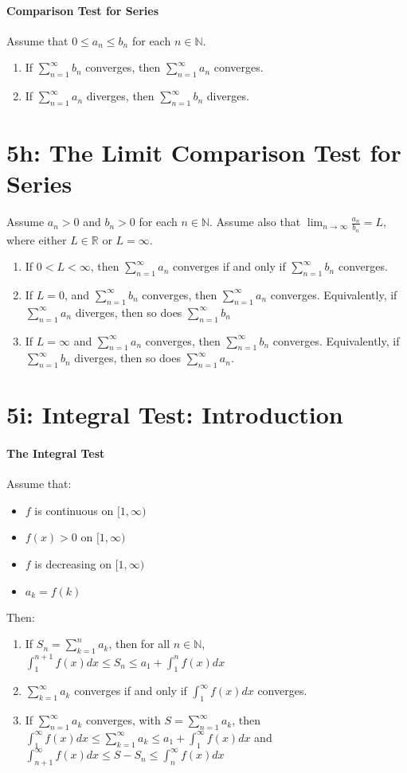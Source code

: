 \documentclass[10pt,letter]{article}
\begin{document}
\paragraph{Comparison Test for Series}
Assume that $0\leq a_n\leq b_n$ for each $n\in\mathbb{N}$. 
\begin{enumerate}
    \item If $\sum_{n=1}^\infty b_n$ converges, then $\sum_{n=1}^\infty a_n$ converges.
    \item If $\sum_{n=1}^\infty a_n$ diverges, then $\sum_{n=1}^\infty b_n$ diverges. 
\end{enumerate}


\section*{5h: The Limit Comparison Test for Series}
Assume $a_n>0$ and $b_n>0$ for each $n\in\mathbb{N}$. Assume also that $\lim_{n\rightarrow\infty}\frac{a_n}{b_n}=L$, where either $L\in\mathbb{R}$ or $L=\infty$. 
\begin{enumerate}
    \item If $0<L<\infty$, then $\sum_{n=1}^\infty a_n$ converges if and only if $\sum_{n=1}^\infty b_n$ converges. 
    \item If $L=0$, and $\sum_{n=1}^\infty b_n$ converges, then $\sum_{n=1}^\infty a_n$ converges. Equivalently, if $\sum_{n=1}^\infty a_n$ diverges, then so does $\sum_{n=1}^\infty b_n$ 
    \item If $L=\infty$ and $\sum_{n=1}^\infty a_n$ converges, then $\sum_{n=1}^\infty b_n$ converges. Equivalently, if $\sum_{n=1}^\infty b_n$ diverges, then so does $\sum_{n=1}^\infty a_n$. 
\end{enumerate}


\section*{5i: Integral Test: Introduction}
\paragraph{The Integral Test}
Assume that: \begin{itemize}
    \item $f$ is continuous on $[1,\infty)$ 
    \item $f(x)>0$ on $[1,\infty)$ 
    \item $f$ is decreasing on $[1,\infty)$ 
    \item $a_k=f(k)$ 
\end{itemize}
Then: 
\begin{enumerate}
    \item If $S_n=\sum_{k=1}^n a_k$, then for all $n\in\mathbb{N}$, $\int_1^{n+1}f(x)dx\leq S_n\leq a_1+\int_1^nf(x)dx$ 
    \item $\sum_{k=1}^\infty a_k$ converges if and only if $\int_1^\infty f(x)dx$ converges. 
    \item If $\sum_{n=1}^\infty a_k$ converges, with $S=\sum_{n=1}^\infty a_k$, then $\int_1^\infty f(x)dx\leq \sum_{k=1}^\infty a_k\leq a_1+\int_{1}^\infty f(x)dx$ and $\int_{n+1}^\infty f(x)dx\leq S-S_n\leq \int_n^\infty f(x)dx$
\end{enumerate}
\end{document}
